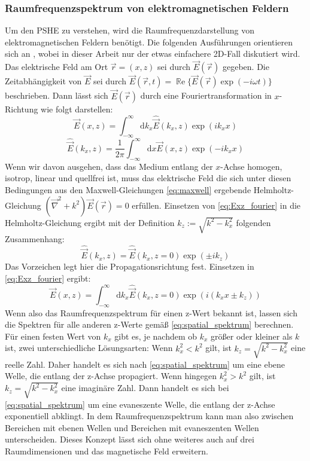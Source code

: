 \documentclass[titlepage,  ngerman]{article}
\renewcommand{\Re}{\operatorname{\mathbb{R}e}}
\begin{document}
	\subsubsection{Raumfrequenzspektrum von elektromagnetischen Feldern}
	Um den PSHE zu verstehen, wird die Raumfrequenzdarstellung von elektromagnetischen Feldern benötigt. Die folgenden Ausführungen orientieren sich an \cite{Novotny.2012b}, wobei in dieser Arbeit nur der etwas einfachere 2D-Fall diskutiert wird.\\		
	Das elektrische Feld am Ort $\vec{r} = (x, z) $ sei durch $\vec{E}({\vec{r}})$ gegeben.
	Die Zeitabhängigkeit von $\vec{E}$ sei durch $\vec{E}({\vec{r}, t})=\Re\{\vec{E}({\vec{r}})\exp(-i\omega t)\}$ beschrieben. Dann lässt sich $\vec{E}({\vec{r}})$ durch eine Fouriertransformation in $x$-Richtung wie folgt darstellen:
	\begin{equation}
		\label{eq:Exz_fourier}
		\vec{E}(x,z) = \int_{-\infty}^{\infty}\mathrm{d}{k_x}\hat{\vec{E}}(k_x,z)\exp(ik_xx)				
	\end{equation}
	\begin{equation}
		\label{eq:EKxz_fourier}
		\hat{\vec{E}}(k_x,z) = \dfrac{1}{2\pi}\int_{-\infty}^{\infty}\mathrm{d}x\vec{E}(x,z)\exp(-ik_xx)
	\end{equation}
	Wenn wir davon ausgehen, dass das Medium entlang der $x$-Achse homogen, isotrop, linear und quellfrei ist, muss das elektrische Feld die sich unter diesen Bedingungen aus den Maxwell-Gleichungen \eqref{eq:maxwell} ergebende Helmholtz-Gleichung $(\vec{\nabla}^2+k^2)\vec{E}({\vec{r}}) = 0$ erfüllen. Einsetzen von \eqref{eq:Exz_fourier} in die Helmholtz-Gleichung ergibt mit der Definition $k_z := \sqrt{k^2-k_x^2}$ folgenden Zusammenhang:
	\begin{equation}
		\label{eq:spatial_spektrum}
		\hat{\vec{E}}(k_x,z) =\hat{\vec{E}}(k_x,z= 0) \exp(\pm ik_ z)
	\end{equation}
	Das Vorzeichen legt hier die Propagationsrichtung fest.
	Einsetzen in \eqref{eq:Exz_fourier} ergibt:
	\begin{equation}
		\label{eq:Espatial_spektrum}
		\vec{E}(x,z) = \int_{-\infty}^{\infty}\mathrm{d}{k_x}\hat{\vec{E}}(k_x,z= 0)\exp(i(k_xx\pm k_ z))
	\end{equation}
	Wenn also das Raumfrequenzspektrum für einen z-Wert bekannt ist, lassen sich die Spektren für alle anderen z-Werte gemäß \eqref{eq:spatial_spektrum} berechnen. Für einen festen Wert von $k_x$ gibt es, je nachdem ob $k_x$ größer oder kleiner als $k$ ist, zwei unterschiedliche Lösungsarten: Wenn $k_x^2 < k^2$ gilt, ist $k_z = \sqrt{k^2-k_x^2}$ eine reelle Zahl. Daher handelt es sich nach \eqref{eq:spatial_spektrum} um eine ebene Welle, die entlang der z-Achse propagiert.
	Wenn hingegen $k_x^2 > k^2$ gilt, ist $k_z = \sqrt{k^2-k_x^2}$ eine imaginäre Zahl. Dann handelt es sich bei \eqref{eq:spatial_spektrum} um eine evaneszente Welle, die entlang der z-Achse exponentiell abklingt. In dem Raumfrequenzspektrum kann man also zwischen Bereichen mit ebenen Wellen und Bereichen mit evaneszenten Wellen unterscheiden. Dieses Konzept lässt sich ohne weiteres auch auf drei Raumdimensionen und das magnetische Feld erweitern.
\end{document}
